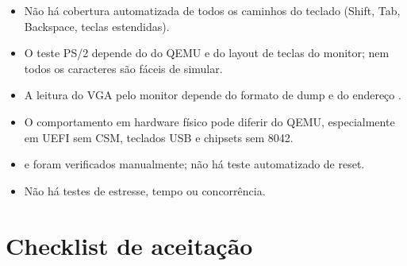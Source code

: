 \begin{itemize}
  \item N\~ao h\'a cobertura automatizada de todos os caminhos do teclado
        (Shift, Tab, Backspace, teclas estendidas).
  \item O teste PS/2 depende do  do QEMU e do layout de teclas
        do monitor; nem todos os caracteres s\~ao f\'aceis de simular.
  \item A leitura do VGA pelo monitor depende do formato de dump e do
        endere\c{c}o .
  \item O comportamento em hardware f\'isico pode diferir do QEMU,
        especialmente em UEFI sem CSM, teclados USB e chipsets sem 8042.
  \item {} e  foram verificados manualmente; n\~ao h\'a
        teste automatizado de reset.
  \item N\~ao h\'a testes de estresse, tempo ou concorr\^encia.
\end{itemize}

\section{Checklist de aceita\c{c}\~ao}

